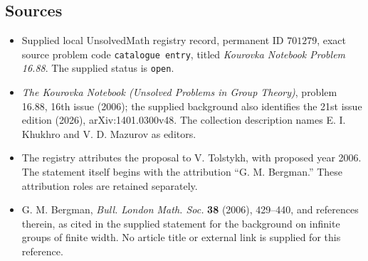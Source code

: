 \documentclass[11pt]{article}
\begin{document}
\subsection{Sources}
\begin{itemize}
\item Supplied local UnsolvedMath registry record, permanent ID \(701279\), exact source problem code \texttt{catalogue entry}, titled \emph{Kourovka Notebook Problem 16.88}. The supplied status is \texttt{open}.
\item \emph{The Kourovka Notebook (Unsolved Problems in Group Theory)}, problem 16.88, 16th issue (2006); the supplied background also identifies the 21st issue edition (2026), arXiv:1401.0300v48. The collection description names E. I. Khukhro and V. D. Mazurov as editors.
\item The registry attributes the proposal to V. Tolstykh, with proposed year 2006. The statement itself begins with the attribution ``G. M. Bergman.'' These attribution roles are retained separately.
\item G. M. Bergman, \emph{Bull. London Math. Soc.} \textbf{38} (2006), 429--440, and references therein, as cited in the supplied statement for the background on infinite groups of finite width. No article title or external link is supplied for this reference.
\end{itemize}
\end{document}
